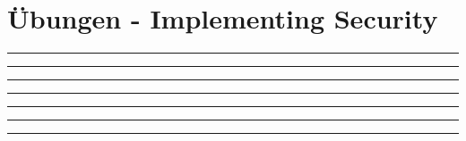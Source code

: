 \section{\"Ubungen - Implementing Security}
  \begin{enumerate}
    
    
    

      \rule{0.94\textwidth}{0.5pt}

    
    

      \rule{0.94\textwidth}{0.5pt}

      \rule{0.94\textwidth}{0.5pt}

    
    
    
    

      \rule{0.94\textwidth}{0.5pt}

    
\clearpage
    

      \rule{0.94\textwidth}{0.5pt}


      \rule{0.94\textwidth}{0.5pt}


      \rule{0.94\textwidth}{0.5pt}

  \end{enumerate}
\clearpage

